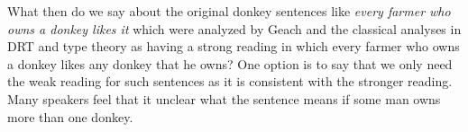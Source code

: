 What then do we say about the
original donkey sentences like \textit{every farmer who owns a donkey
  likes it} which were analyzed by Geach and the classical analyses in
DRT and type theory as having a strong reading in which every farmer
who owns a donkey likes any donkey that he owns?  One option is to say
that we only need the weak reading for such sentences as it is
consistent with the stronger reading.  Many speakers feel that it
unclear what the sentence means if some man owns more than one donkey.
